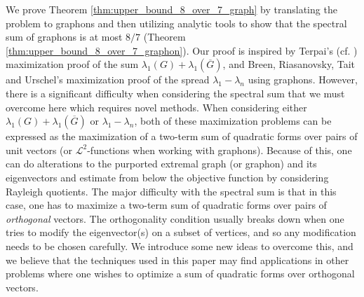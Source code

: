 \documentclass[11pt]{article}
\theoremstyle{plain}
\theoremstyle{definition}
\numberwithin{equation}{section}
\begin{document}
We prove Theorem \ref{thm:upper_bound_8_over_7_graph} by translating the problem to graphons and 
then utilizing analytic tools to show that the spectral sum of graphons is at most $8/7$ 
(Theorem \ref{thm:upper_bound_8_over_7_graphon}). Our proof is inspired by Terpai's \cite{Terpai_2011} 
(cf. \cite{Liu_2024}) maximization proof of the sum $\lambda_1(G) + \lambda_1(\overline{G})$, 
and Breen, Riasanovsky, Tait and Urschel's \cite{Breen_Riasanovsky_Tait_Urschel_2022} maximization 
proof of the spread $\lambda_1 - \lambda_n$ using graphons. However, there is a significant 
difficulty when considering the spectral sum that we must overcome here which requires novel methods. 
When considering either $\lambda_1(G) + \lambda_1(\overline{G})$ or $\lambda_1 - \lambda_n$, 
both of these maximization problems can be expressed as the maximization of a two-term sum 
of quadratic forms over pairs of unit vectors (or $\mathscr{L}^2$-functions when working with graphons). 
Because of this, one can do alterations to the purported extremal graph (or graphon) 
and its eigenvectors and estimate from below the objective function by considering 
Rayleigh quotients. The major difficulty with the spectral sum is that in this case, 
one has to maximize a two-term sum of quadratic forms over pairs of \emph{orthogonal} 
vectors. The orthogonality condition usually breaks down when one tries to modify the eigenvector(s) 
on a subset of vertices, and so any modification needs to be chosen carefully. We introduce some new 
ideas to overcome this, and we believe that the techniques used in this paper may find applications 
in other problems where one wishes to optimize a sum of quadratic forms over orthogonal vectors.
\medskip
\end{document}

